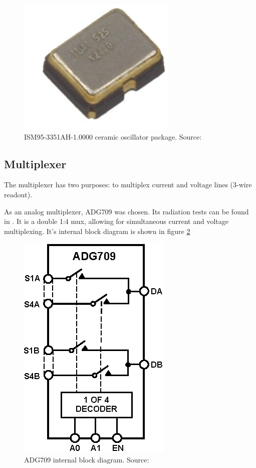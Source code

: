         \begin{figure}[H]
            \centering
            \includegraphics[width=0.5\paperwidth]{img/06/ISM95.png}
            \caption{ISM95-3351AH-1.0000 ceramic oscillator package. Source: \cite{ISM95_series_datasheet}}
            \label{ISM95-3351AH-1.0000}
        \end{figure}


    \subsection{Multiplexer}
        The multiplexer has two purposes: to multiplex current and voltage lines (3-wire readout).

        As an analog multiplexer, ADG709 was chosen. Its radiation tests can be found in \cite{IEEE_radiation_tests_1992_2009}. It is a double 1:4 mux, allowing for simultaneous current and voltage multiplexing. It's internal block diagram is shown in figure \ref{ADG709_block}

        \begin{figure}[H]
            \centering
            \includegraphics[width=0.3\paperwidth]{img/06/ADG709.eps}
            \caption{ADG709 internal block diagram. Source: \cite{ADG709_datasheet}}
            \label{ADG709_block}
        \end{figure}

